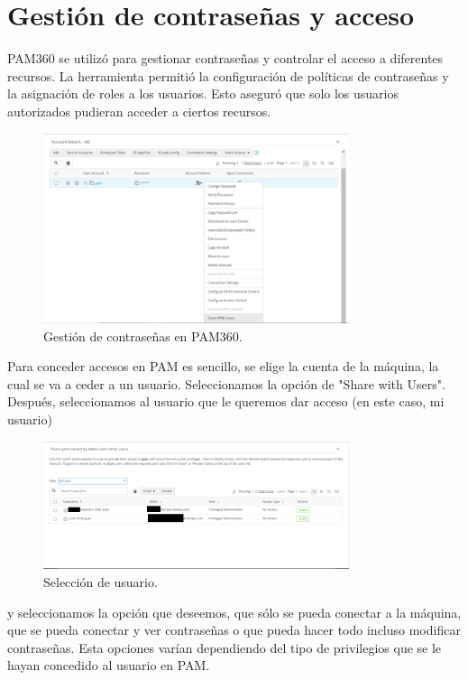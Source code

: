 \section{Gestión de contraseñas y acceso}
PAM360 se utilizó para gestionar contraseñas y controlar el acceso a diferentes recursos. La herramienta permitió la configuración de políticas de contraseñas y la asignación de roles a los usuarios. Esto aseguró que solo los usuarios autorizados pudieran acceder a ciertos recursos.

\begin{figure}[H]
	\centering
	\includegraphics[width=0.8\textwidth]{./img/share_account_pam.png}
	\caption{Gestión de contraseñas en PAM360.}
	\label{fig:share_account_pam}
\end{figure}

Para conceder accesos en PAM es sencillo, se elige la cuenta de la máquina, la cual se va a ceder a un usuario. Seleccionamos la opción de "Share with Users".
Después, seleccionamos al usuario que le queremos dar acceso (en este caso, mi usuario)

\begin{figure}[H]
	\centering
	\includegraphics[width=0.8\textwidth]{./img/share_account_seleccion.png}
	\caption{Selección de usuario.}
	\label{fig:share_account}
\end{figure}

y seleccionamos la opción que deseemos, que sólo se pueda conectar a la máquina, que se pueda conectar y ver contraseñas o que pueda hacer todo incluso modificar contraseñas. Esta opciones varían dependiendo del tipo de privilegios que se le hayan concedido al usuario en PAM.

